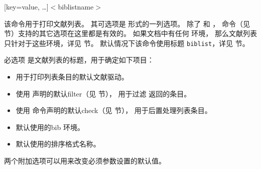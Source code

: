 \begin{ltxsyntax}

[key=value, \dots]{$<$biblistname$>$}


该命令用于打印文献列表。
其可选项是 \keyval 形式的一列选项。
除了  和 ，
 命令（见  节）支持的其它选项在这里都是有效的。
如果文档中有任何  环境，
那么文献列表只针对于这些环境，详见  节。
默认情况下该命令使用标题 \texttt{biblist}，详见  节。

必选项  是文献列表的标题，用于确定如下项目：
\begin{itemize}
\item %
用于打印列表条目的默认文献驱动。
\item %
使用  声明的默认filter（见  节），
用于过滤 \biber 返回的条目。
\item %
使用  命令声明的默认check（见  节），
用于后置处理列表条目。
\item %
默认使用的bib 环境。
\item %
默认使用的排序格式名称。
\end{itemize}



两个附加选项可以用来改变必须参数设置的默认值。


\end{ltxsyntax}
